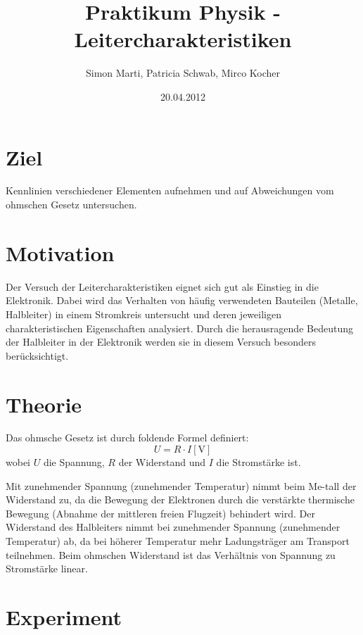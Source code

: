 \documentclass[12pt,a4paper]{article}
\title{Praktikum Physik - Leitercharakteristiken}
\author{Simon Marti, Patricia Schwab, Mirco Kocher}
\date{20.04.2012}
\begin{document}
\maketitle

\section*{Ziel}
Kennlinien verschiedener Elementen aufnehmen und auf Abweichungen vom ohmschen Gesetz untersuchen.

\section*{Motivation}
Der Versuch der Leitercharakteristiken eignet sich gut als Einstieg in die Elektronik. Dabei wird das Verhalten von h\"aufig verwendeten Bauteilen (Metalle, Halbleiter) in einem Stromkreis untersucht und deren jeweiligen charakteristischen Eigenschaften analysiert. Durch die herausragende Bedeutung der Halbleiter in der Elektronik werden sie in diesem Versuch besonders ber\"ucksichtigt.

\section*{Theorie}
Das ohmsche Gesetz ist durch foldende Formel definiert:
\begin{equation}
U=R\cdot I [\mbox{V}]
\end{equation}
wobei $U$ die Spannung, $R$ der Widerstand und $I$ die Stromst\"arke ist. 


Mit zunehmender Spannung (zunehmender Temperatur) nimmt beim Me-tall der Widerstand zu, da die Bewegung der Elektronen durch die verst\"arkte thermische Bewegung (Abnahme der mittleren freien Flugzeit) behindert wird.
Der Widerstand des Halbleiters nimmt bei zunehmender Spannung (zunehmender Temperatur) ab, da bei h\"oherer Temperatur mehr Ladungstr\"ager am Transport teilnehmen.
Beim ohmschen Widerstand ist das Verh\"altnis von Spannung zu Stromst\"arke linear.

\section*{Experiment}
\end{document}
